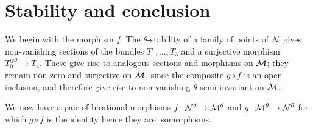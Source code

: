 \documentclass{amsart}
\theoremstyle{definition}
\begin{document}
\section{Stability and conclusion}

We begin with the morphism $f$.
The $\theta$-stability of a family of points of $\mathcal{N}$ gives non-vanishing sections of the bundles $T_1, \ldots, T_3$ and a surjective morphism $T_0^{\oplus 2} \rightarrow T_4$.
These give rise to analogous sections and morphisms on $\mathcal{M}$; they remain non-zero and surjective on $\mathcal{M}$, since the composite $g \circ f$ is an open inclusion, and therefore give rise to non-vanishing $\theta$-semi-invariant on $\mathcal{M}$.

We now have a pair of birational morphisms $f \colon \mathcal{N}^\theta \rightarrow \mathcal{M}^\theta$ and $g \colon \mathcal{M}^\theta \rightarrow \mathcal{N}^\theta$ for which $g \circ f$ is the identity hence they are isomorphisms.
\end{document}
